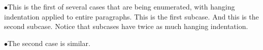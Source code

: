 \item{$\bullet$}This is the first of several cases that are being enumerated, with hanging
indentation applied to entire paragraphs.
\itemitem{$\bullet$}This is the first subcase.
\itemitem{$\bullet$}And this is the second subcase. Notice that subcases have twice as
much hanging indentation.
\item{$\bullet$}The second case is similar.

\bye


